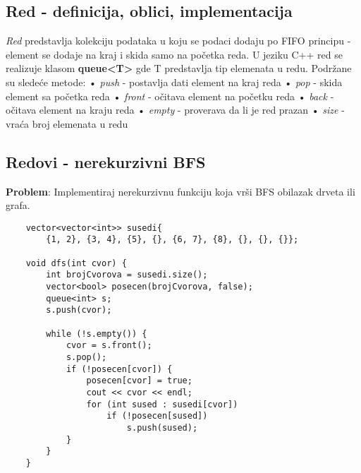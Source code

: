 \documentclass{article}
\begin{document}
\subsection{Red - definicija, oblici, implementacija}
\textit{Red} predstavlja kolekciju podataka u koju se podaci dodaju po FIFO principu - element se dodaje na kraj i skida samo na početka reda. U jeziku C++ red se realizuje klasom \textbf{queue<T>} gde T predstavlja tip elemenata
u redu. Podržane su sledeće metode:
\newline \hspace*{0.4cm}• \textit{push} - postavlja dati element na kraj reda
\newline \hspace*{0.4cm}• \textit{pop} - skida element sa početka reda
\newline \hspace*{0.4cm}• \textit{front} - očitava element na početku reda
\newline \hspace*{0.4cm}• \textit{back} - očitava element na kraju reda
\newline \hspace*{0.4cm}• \textit{empty} - proverava da li je red prazan
\newline \hspace*{0.4cm}• \textit{size} - vraća broj elemenata u redu

\subsection{Redovi - nerekurzivni BFS}
\textbf{Problem}: Implementiraj nerekurzivnu funkciju koja vrši BFS obilazak drveta
ili grafa.
\begin{lstlisting}
    vector<vector<int>> susedi{
        {1, 2}, {3, 4}, {5}, {}, {6, 7}, {8}, {}, {}, {}};

    void dfs(int cvor) {
        int brojCvorova = susedi.size();
        vector<bool> posecen(brojCvorova, false);
        queue<int> s;
        s.push(cvor);

        while (!s.empty()) {
            cvor = s.front();
            s.pop();
            if (!posecen[cvor]) {
                posecen[cvor] = true;
                cout << cvor << endl;
                for (int sused : susedi[cvor])
                    if (!posecen[sused])
                        s.push(sused);
            }
        }
    }
\end{lstlisting}

\newpage
\end{document}
